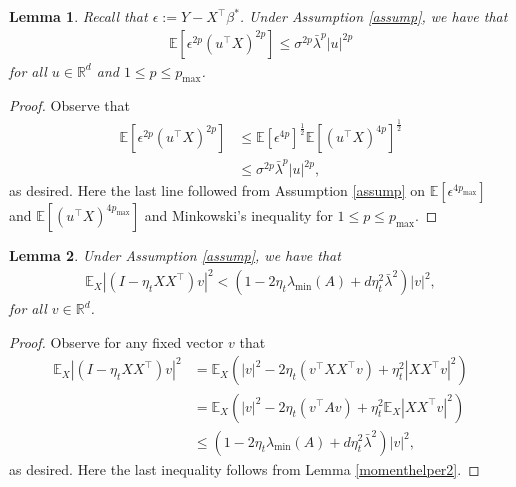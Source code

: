 \documentclass[11pt, reqno,english]{amsart}
\newtheorem{lemma}{Lemma}[section]
\begin{document}
\begin{lemma}\label{noise-moment-upper-bound}
Recall that $\epsilon := Y - X^\top \beta^*$. Under Assumption \ref{assump}, we have that
\begin{align*}
\mathbb{E}[\epsilon^{2p}(u^\top X)^{2p}] \leq \sigma^{2p}\bar{\lambda}^{p} |u|^{2p}
\end{align*}
for all $u \in \mathbb{R}^d$ and $1 \leq p \leq p_{\max}$.
\end{lemma}
\begin{proof}
Observe that 
\begin{align*}
\mathbb{E}[\epsilon^{2p}(u^\top X)^{2p}] &\leq \mathbb{E}[\epsilon^{4p}]^{\frac{1}{2}}\mathbb{E}[(u^\top X)^{4p}]^{\frac{1}{2}}
\\
&\leq \sigma^{2p}\bar{\lambda}^{p}|u|^{2p},
\end{align*}
as desired. Here the last line followed from Assumption \ref{assump} on $\mathbb{E}[\epsilon^{4p_{\max}}]$ and $\mathbb{E}[(u^\top X)^{4p_{\max}}]$ and Minkowski's inequality for $1 \leq p \leq p_{\max}$.
\end{proof}
\begin{lemma}\label{momenthelper1}
Under Assumption \ref{assump}, we have that
\begin{align*}
\mathbb{E}_{X}|(I - \eta_t XX^\top)v|^2  < (1 - 2\eta_{t}\lambda_{\min}(A) + d\eta_{t}^2\bar{\lambda}^2)|v|^2,
\end{align*}
for all $v \in \mathbb{R}^d$.
\end{lemma}
\begin{proof}
Observe for any fixed vector $v$ that
\begin{align*}
\mathbb{E}_{X}|(I - \eta_{t}XX^\top)v|^2 &= \mathbb{E}_X(|v|^2 - 2\eta_{t}(v^\top XX^\top v) + \eta_{t}^2 |XX^\top v|^2)
\\
&= \mathbb{E}_X(|v|^2 - 2\eta_{t}(v^\top A v) + \eta^2_{t} \mathbb{E}_X |XX^\top v|^2)
\\
&\leq (1 - 2\eta_{t}\lambda_{\min}(A) + d\eta_{t}^2\bar{\lambda}^2)|v|^2,
\end{align*}
as desired. Here the last inequality follows from  Lemma \ref{momenthelper2}.
\end{proof}
\end{document}
